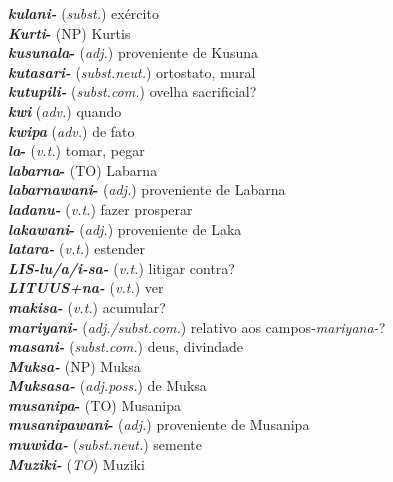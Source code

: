 \begin{multicols}{2}
\begin{hangparas}{1em}{1}
		\textbf{\emph{kulani-}} (\emph{subst.}) \tabto{1em} exército\\
		\textbf{\emph{Kurti}-} (NP) \tabto{1em} Kurtis\\
		\textbf{\emph{kusunala}-} (\emph{adj.}) \tabto{1em} proveniente de Kusuna\\
		\textbf{\emph{kutasari-}} (\emph{subst.neut.}) \tabto{1em} ortostato, mural\\
		\columnbreak%
		\textbf{\emph{kutupili-}} (\emph{subst.com.}) \tabto{1em} ovelha sacrificial?\\
		\textbf{\emph{kwi}} (\emph{adv.}) \tabto{1em} quando\\
		\textbf{\emph{kwipa}} (\emph{adv.}) \tabto{1em} de fato\\
		\textbf{\emph{la}-} (\emph{v.t.}) \tabto{1em} tomar, pegar\\
		\textbf{\emph{labarna}-} (TO) \tabto{1em} Labarna \\
		\textbf{\emph{labarnawani}-} (\emph{adj.}) \tabto{1em} proveniente de Labarna\\
		\textbf{\emph{ladanu-}} (\emph{v.t.}) \tabto{1em} fazer prosperar\\
		\textbf{\emph{lakawani}-} (\emph{adj.}) \tabto{1em} proveniente de Laka\\
		\textbf{\emph{latara-}} (\emph{v.t.}) \tabto{1em} estender\\
		\textbf{\emph{\emph{LIS}-lu/a/i-sa-}} (\emph{v.t.}) \tabto{1em} litigar contra?\\
		\textbf{\emph{\emph{LITUUS}+na-}} (\emph{v.t.}) \tabto{1em} ver\\
		\textbf{\emph{makisa-}} (\emph{v.t.}) \tabto{1em} acumular?\\
		\textbf{\emph{mariyani-}} (\emph{adj./subst.com.}) \tabto{1em} relativo aos campos-\emph{mariyana-}?\\
		\textbf{\emph{masani-}} (\emph{subst.com.}) \tabto{1em} deus, divindade\\
		\textbf{\emph{Muksa-}} (NP) \tabto{1em} Muksa\\
		\textbf{\emph{Muksasa-}} (\emph{adj.poss.}) \tabto{1em} de Muksa\\
		\textbf{\emph{musanipa}-} (TO) \tabto{1em} Musanipa\\
		\textbf{\emph{musanipawani}-} (\emph{adj.}) \tabto{1em} proveniente de Musanipa\\
		\textbf{\emph{muwida-}} (\emph{subst.neut.}) \tabto{1em} semente\\
		\textbf{\emph{Muziki-}} (\emph{TO}) \tabto{1em} Muziki\\

\end{hangparas}
\end{multicols}
